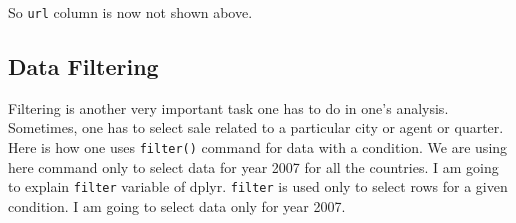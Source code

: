 \documentclass[
  letterpaper,
  DIV=11,
  numbers=noendperiod]{scrartcl}
\begin{document}
So \texttt{url} column is now not shown above.

\hypertarget{data-filtering}{%
\subsection{Data Filtering}\label{data-filtering}}

Filtering is another very important task one has to do in one's
analysis. Sometimes, one has to select sale related to a particular city
or agent or quarter. Here is how one uses \texttt{filter()} command for
data with a condition. We are using here command only to select data for
year 2007 for all the countries. I am going to explain \texttt{filter}
variable of dplyr. \texttt{filter} is used only to select rows for a
given condition. I am going to select data only for year 2007.
\end{document}

